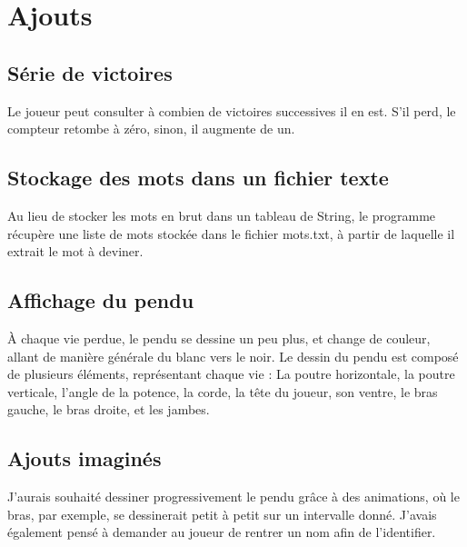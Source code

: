 \documentclass{report}
\begin{document}
\chapter{Ajouts}
\section{Série de victoires}
Le joueur peut consulter à combien de victoires successives il en est. S'il perd, le compteur retombe à zéro, sinon, il augmente de un.

\section{Stockage des mots dans un fichier texte}
Au lieu de stocker les mots en brut dans un tableau de String, le programme récupère une liste de mots stockée dans le fichier mots.txt, à partir de laquelle il extrait le mot à deviner.

\section{Affichage du pendu}
À chaque vie perdue, le pendu se dessine un peu plus, et change de couleur, allant de manière générale du blanc vers le noir. Le dessin du pendu est composé de plusieurs éléments, représentant chaque vie : La poutre horizontale, la poutre verticale, l'angle de la potence, la corde, la tête du joueur, son ventre, le bras gauche, le bras droite, et les jambes.

\section{Ajouts imaginés}
J'aurais souhaité dessiner progressivement le pendu grâce à des animations, où le bras, par exemple, se dessinerait petit à petit sur un intervalle donné. J'avais également pensé à demander au joueur de rentrer un nom afin de l'identifier.
\end{document}
